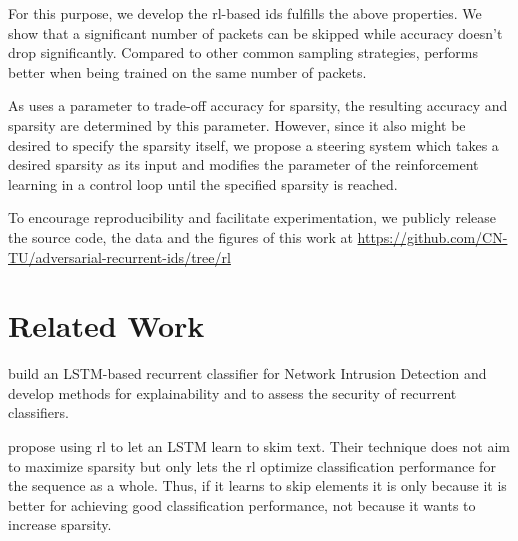 \documentclass[conference]{IEEEtran}
\begin{document}
For this purpose, we develop the \gls{rl}-based \gls{ids} \textit{\ours{}} fulfills the above properties. We show that a significant number of packets can be skipped while accuracy doesn't drop significantly. Compared to other common sampling strategies, \ours{} performs better when being trained on the same number of packets. 


As \ours{} uses a parameter to trade-off accuracy for sparsity, the resulting accuracy and sparsity are determined by this parameter. However, since it also might be desired to specify the sparsity itself, we propose a steering system which takes a desired sparsity as its input and modifies the parameter of the reinforcement learning in a control loop until the specified sparsity is reached. 


To encourage reproducibility and facilitate experimentation, we publicly release the source code, the data and the figures of this work at \url{https://github.com/CN-TU/adversarial-recurrent-ids/tree/rl}

\section{Related Work}

\cite{hartl_explainability_2019} build an LSTM-based recurrent classifier for Network Intrusion Detection and develop methods for explainability and to assess the security of recurrent classifiers. 

\cite{yu_learning_2017} propose using \gls{rl} to let an LSTM learn to skim text. Their technique does not aim to maximize sparsity but only lets the \gls{rl} optimize classification performance for the sequence as a whole. Thus, if it learns to skip elements it is only because it is better for achieving good classification performance, not because it wants to increase sparsity. 
\end{document}
